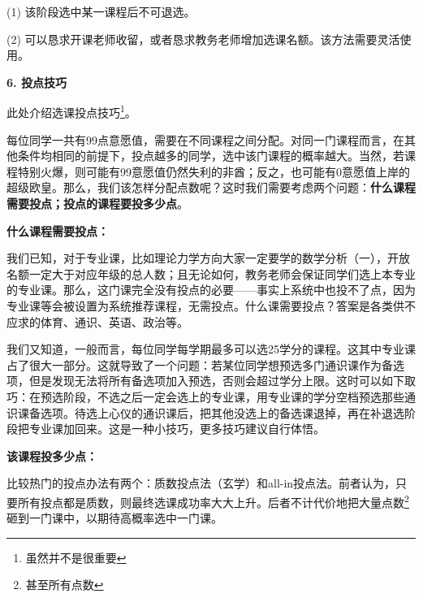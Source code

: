 \documentclass[11pt,oneside]{book}
\begin{document}
\vspace{10pt}

(1) 该阶段选中某一课程后不可退选。

\vspace{10pt}

(2) 可以恳求开课老师收留，或者恳求教务老师增加选课名额。该方法需要灵活使用。

\vspace{10pt}

\textbf{6. 投点技巧}

此处介绍选课投点技巧\footnote{虽然并不是很重要}。

\vspace{10pt}

每位同学一共有99点意愿值，需要在不同课程之间分配。对同一门课程而言，在其他条件均相同的前提下，投点越多的同学，选中该门课程的概率越大。当然，若课程特别火爆，则可能有99意愿值仍然失利的非酋；反之，也可能有0意愿值上岸的超级欧皇。那么，我们该怎样分配点数呢？这时我们需要考虑两个问题：\textbf{什么课程需要投点；投点的课程要投多少点}。

\vspace{10pt}

\textbf{什么课程需要投点：}

\vspace{10pt}

我们已知，对于专业课，比如理论力学方向大家一定要学的数学分析（一），开放名额一定大于对应年级的总人数；且无论如何，教务老师会保证同学们选上本专业的专业课。那么，这门课完全没有投点的必要——事实上系统中也投不了点，因为专业课等会被设置为系统推荐课程，无需投点。什么课需要投点？答案是各类供不应求的体育、通识、英语、政治等。

\vspace{10pt}

我们又知道，一般而言，每位同学每学期最多可以选25学分的课程。这其中专业课占了很大一部分。这就导致了一个问题：若某位同学想预选多门通识课作为备选项，但是发现无法将所有备选项加入预选，否则会超过学分上限。这时可以如下取巧：在预选阶段，不选之后一定会选上的专业课，用专业课的学分空档预选那些通识课备选项。待选上心仪的通识课后，把其他没选上的备选课退掉，再在补退选阶段把专业课加回来。这是一种小技巧，更多技巧建议自行体悟。

\vspace{10pt}

\textbf{该课程投多少点：}

\vspace{10pt}

比较热门的投点办法有两个：质数投点法（玄学）和all-in投点法。前者认为，只要所有投点都是质数，则最终选课成功率大大上升。后者不计代价地把大量点数\footnote{甚至所有点数}砸到一门课中，以期待高概率选中一门课。
\end{document}
